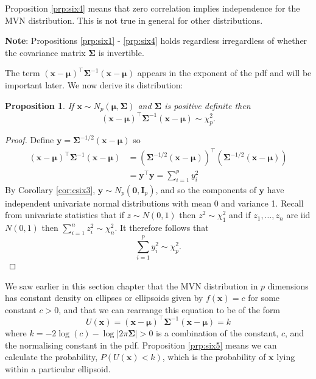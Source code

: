 \documentclass[]{book}
\newtheorem{proposition}{Proposition}[chapter]
\theoremstyle{definition}
\theoremstyle{definition}
\theoremstyle{definition}
\theoremstyle{remark}
\begin{document}
Proposition \ref{prp:six4} means that zero correlation implies independence for the MVN distribution. This is not true in general for other distributions.

\textbf{Note}: Propositions \ref{prp:six1} - \ref{prp:six4} holds regardless irregardless of whether the covariance matrix \(\boldsymbol \Sigma\) is invertible.

The term \((\boldsymbol x-\boldsymbol \mu)^\top \boldsymbol \Sigma^{-1} (\boldsymbol x-\boldsymbol \mu)\) appears in the exponent of the pdf and
will be important later. We now derive its distribution:

\begin{proposition}
\protect\hypertarget{prp:six5}{}{\label{prp:six5} }If \(\boldsymbol x\sim N_p(\boldsymbol \mu, \boldsymbol \Sigma)\) and \(\boldsymbol \Sigma\) is positive definite then
\[(\boldsymbol x-\boldsymbol \mu)^\top \boldsymbol \Sigma^{-1} (\boldsymbol x-\boldsymbol \mu) \sim \chi_p^2.\]
\end{proposition}

\begin{proof}
{}Define \(\boldsymbol y= \boldsymbol \Sigma^{-1/2} (\boldsymbol x-\boldsymbol \mu)\) so
\begin{align*}
(\boldsymbol x-\boldsymbol \mu)^\top \boldsymbol \Sigma^{-1} (\boldsymbol x-\boldsymbol \mu) &= \left(\boldsymbol \Sigma^{-1/2} (\boldsymbol x-\boldsymbol \mu) \right)^\top \left(\boldsymbol \Sigma^{-1/2} (\boldsymbol x-\boldsymbol \mu) \right)\\
&= \boldsymbol y^\top \boldsymbol y= \sum_{i=1}^p y_i^2
\end{align*}
By Corollary \ref{cor:csix3}, \(\boldsymbol y\sim N_p (\boldsymbol 0, \mathbf I_p)\), and so the components of \(\boldsymbol y\) have independent univariate normal distributions with mean 0 and variance 1. Recall from univariate statistics that if \(z \sim N(0,1)\) then \(z^2 \sim \chi^2_1\) and if \(z_1, \ldots, z_n\) are iid \(N(0,1)\) then \(\sum_{i=1}^n z_i^2 \sim \chi_n^2\). It therefore follows that \[\sum_{i=1}^p y_i^2 \sim \chi^2_p.\]
\end{proof}

We saw earlier in this section chapter that the MVN distribution in \(p\) dimensions has constant density on ellipses or ellipsoids given by \(f(\boldsymbol x) = c\) for some constant \(c > 0\), and that we can rearrange this equation to be of the form
\[U(\boldsymbol x) = (\boldsymbol x-\boldsymbol \mu)^\top \boldsymbol \Sigma^{-1} (\boldsymbol x-\boldsymbol \mu) = k\]
where \(k = - 2 \log(c) - \log |2 \pi \boldsymbol \Sigma| > 0\) is a combination of the constant, \(c\), and the normalising constant in the pdf. Proposition \ref{prp:six5} means we can calculate the probability, \(P(U(\boldsymbol x)<k)\), which is the probability of \(\boldsymbol x\) lying within a particular ellipsoid.
\end{document}
